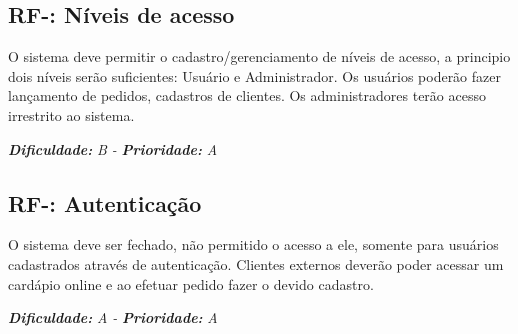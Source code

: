 \subsection{RF-\nreq: Níveis de acesso}
O sistema deve permitir o cadastro/gerenciamento de níveis de acesso, a principio dois níveis serão suficientes: Usuário e 
Administrador.
Os usuários poderão fazer lançamento de pedidos, cadastros de clientes.
Os administradores terão acesso irrestrito ao sistema.

\vspace{0.5cm}
\noindent\textbf{\textit{Dificuldade:}} \textit{B -} \textbf{\textit{Prioridade:}} \textit{A}
\vspace{0.5cm}

\pgfmathtruncatemacro{}
\subsection{RF-\nreq: Autenticação}
O sistema deve ser fechado, não permitido o acesso a ele, somente para usuários cadastrados através de autenticação.
Clientes externos deverão poder acessar um cardápio online e ao efetuar pedido fazer o devido cadastro.

\vspace{0.5cm}
\noindent\textbf{\textit{Dificuldade:}} \textit{A -} \textbf{\textit{Prioridade:}} \textit{A}
\vspace{0.5cm}

